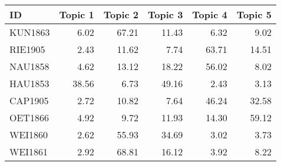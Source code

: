 \begin{tabular}{lrrrrr}
\toprule
     ID &  Topic 1 &  Topic 2 &  Topic 3 &  Topic 4 &  Topic 5 \\
\midrule
KUN1863 &     6.02 &    67.21 &    11.43 &     6.32 &     9.02 \\
RIE1905 &     2.43 &    11.62 &     7.74 &    63.71 &    14.51 \\
NAU1858 &     4.62 &    13.12 &    18.22 &    56.02 &     8.02 \\
HAU1853 &    38.56 &     6.73 &    49.16 &     2.43 &     3.13 \\
CAP1905 &     2.72 &    10.82 &     7.64 &    46.24 &    32.58 \\
OET1866 &     4.92 &     9.72 &    11.93 &    14.30 &    59.12 \\
WEI1860 &     2.62 &    55.93 &    34.69 &     3.02 &     3.73 \\
WEI1861 &     2.92 &    68.81 &    16.12 &     3.92 &     8.22 \\
\bottomrule
\end{tabular}
